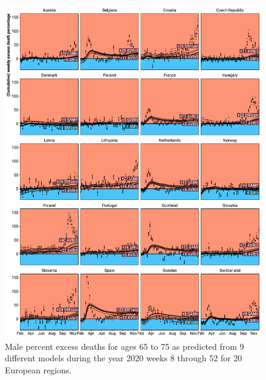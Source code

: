 \documentclass[12pt]{article}
\begin{document}
\begin{appendix}
\begin{figure}
\caption{
Male percent excess deaths for ages 65 to 75 as predicted from 9 different models during the year 2020 weeks 8 through 52 for 20 European regions.}
\label{fig:excessm65to75}
\includegraphics{excess_male__65_75_.pdf}
\end{figure}


\end{appendix}
\end{document}
